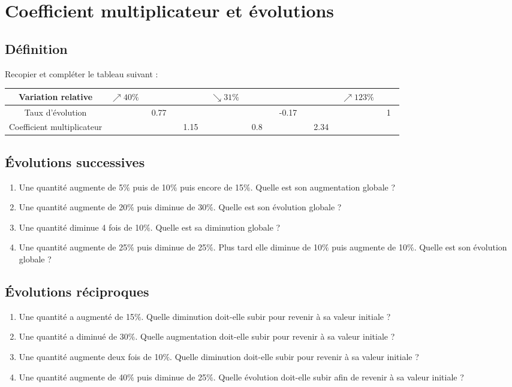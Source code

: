 \documentclass[oneside,12pt]{article}          %
\begin{document}
\section{Coefficient multiplicateur et évolutions}

\subsection{Définition}
Recopier et compléter le tableau suivant :

\renewcommand{\arraystretch}{1.5}
\begin{tabular}{|c||c|c|c|c|c|c|c|c|c|} \hline
    Variation relative & $\nearrow 40\%$ & & & $\searrow 31\%$ & & & & $\nearrow 123\%$ & \\ \hline
    Taux d'évolution & & ~0.77~ & & & & ~-0.17~ & & & ~1~ \\ \hline
    Coefficient multiplicateur & & & ~1.15~ & & ~0.8~ & & ~2.34~ & & \\ \hline
\end{tabular}



\subsection{Évolutions successives}
\begin{enumerate}
    \item Une quantité augmente de 5$\%$ puis de 10$\%$ puis encore de 15$\%$.  Quelle est son augmentation globale ?
    \item Une quantité augmente de 20$\%$ puis diminue de 30$\%$. Quelle est son évolution globale ?
    \item Une quantité diminue 4 fois de 10$\%$. Quelle est sa diminution globale ?
    \item Une quantité augmente de 25$\%$ puis diminue de 25$\%$. Plus tard elle diminue de 10$\%$ puis augmente de 10$\%$. Quelle est son évolution globale ?
\end{enumerate}



\subsection{Évolutions réciproques}
\begin{enumerate}
	\item Une quantité a augmenté de 15$\%$. Quelle diminution doit-elle subir pour revenir à sa valeur initiale ?
	\item Une quantité a diminué de 30$\%$. Quelle augmentation doit-elle subir pour revenir à sa valeur initiale ?
	\item Une quantité augmente deux fois de 10$\%$. Quelle diminution doit-elle subir pour revenir à sa valeur initiale ?
	\item Une quantité augmente de 40$\%$ puis diminue de 25$\%$. Quelle évolution doit-elle subir afin de revenir à sa valeur initiale ?
\end{enumerate}
\end{document}
